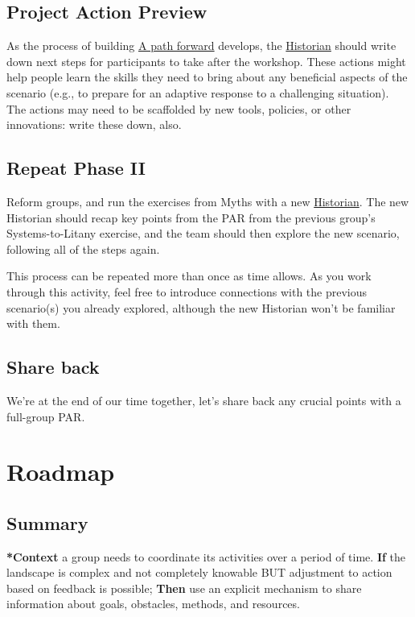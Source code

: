 \documentclass[11pt]{article}
\begin{document}
\subsection{Project Action Preview}
\label{baa168fb-37a0-4144-ab16-d4962728ea9c}
As the process of building \hyperref[7c0dce3b-d5ea-4712-a771-6ff26f143686]{A path forward} develops, the \hyperref[57d46961-a056-435e-85d2-27ab6e0de7f6]{Historian}
should write down next steps for participants to take after the
workshop.  These actions might help people learn the skills they need
to bring about any beneficial aspects of the scenario (e.g., to
prepare for an adaptive response to a challenging situation).  The
actions may need to be scaffolded by new tools, policies, or other
innovations: write these down, also.
\subsection{Repeat Phase II}
\label{092e4fe4-ee4f-494d-8776-c5f1389e8dc0}
Reform groups, and run the exercises from Myths with a new
\hyperref[57d46961-a056-435e-85d2-27ab6e0de7f6]{Historian}. The new Historian should recap key points from the PAR from
the previous group’s Systems-to-Litany exercise, and the team should
then explore the new scenario, following all of the steps again.

This process can be repeated more than once as time allows. As you
work through this activity, feel free to introduce connections with
the previous scenario(s) you already explored, although the new
Historian won’t be familiar with them.
\subsection{Share back}
\label{848c8c3d-cde3-48b4-9dae-23eca4db440d}
We’re at the end of our time together, let’s share back any crucial points with a full-group PAR.

\section{Roadmap}
\label{92e18906-d0e6-4e73-a9cf-fbdad931f3cf}
\subsection{Summary}
\label{sec:orga4e8af5}

\textbf{*Context} a group needs to coordinate its activities over a period of
time. \textbf{If} the landscape is complex and not completely knowable BUT
adjustment to action based on feedback is possible; \textbf{Then} use an
explicit mechanism to share information about goals, obstacles, methods,
and resources.
\end{document}
